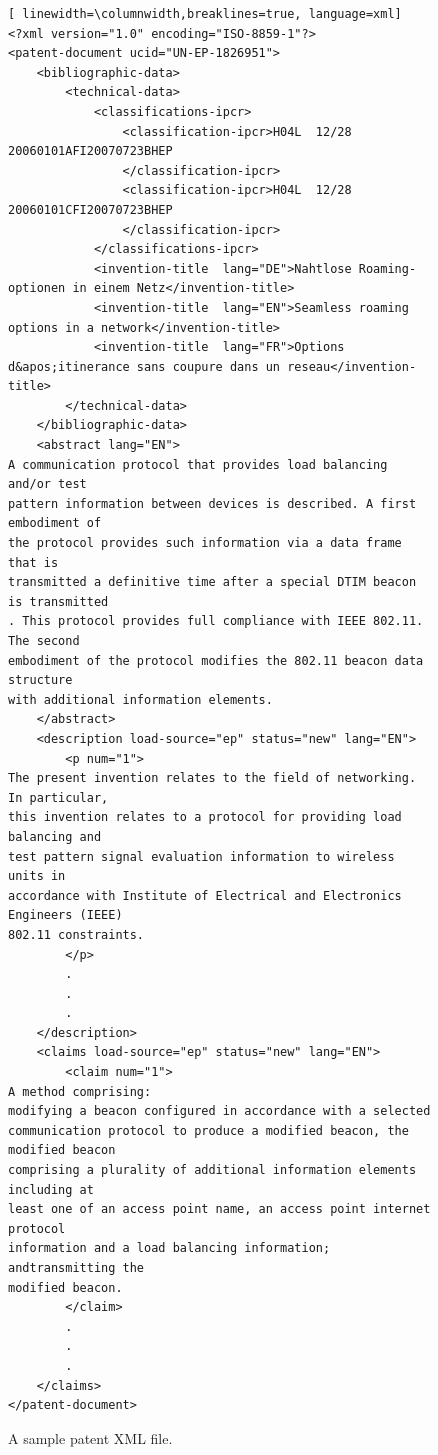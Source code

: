 \begin{figure}[htpb]
\begin{framed}
\vspace*{-2ex}
  \centering
  \begin{lstlisting}[ linewidth=\columnwidth,breaklines=true, language=xml]     
<?xml version="1.0" encoding="ISO-8859-1"?>
<patent-document ucid="UN-EP-1826951">
	<bibliographic-data>
		<technical-data>
			<classifications-ipcr>
				<classification-ipcr>H04L  12/28        20060101AFI20070723BHEP        
				</classification-ipcr>
				<classification-ipcr>H04L  12/28        20060101CFI20070723BHEP        
				</classification-ipcr>
			</classifications-ipcr>
			<invention-title  lang="DE">Nahtlose Roaming-optionen in einem Netz</invention-title>
			<invention-title  lang="EN">Seamless roaming options in a network</invention-title>
			<invention-title  lang="FR">Options d&apos;itinerance sans coupure dans un reseau</invention-title>
		</technical-data>
	</bibliographic-data>
	<abstract lang="EN">
A communication protocol that provides load balancing and/or test 
pattern information between devices is described. A first embodiment of 
the protocol provides such information via a data frame that is 
transmitted a definitive time after a special DTIM beacon is transmitted
. This protocol provides full compliance with IEEE 802.11. The second 
embodiment of the protocol modifies the 802.11 beacon data structure 
with additional information elements.
	</abstract>
	<description load-source="ep" status="new" lang="EN">
		<p num="1">
The present invention relates to the field of networking. In particular, 
this invention relates to a protocol for providing load balancing and 
test pattern signal evaluation information to wireless units in 
accordance with Institute of Electrical and Electronics Engineers (IEEE) 
802.11 constraints.
		</p>
		.
		.
		.
	</description>
	<claims load-source="ep" status="new" lang="EN">
		<claim num="1">
A method comprising:
modifying a beacon configured in accordance with a selected 
communication protocol to produce a modified beacon, the modified beacon 
comprising a plurality of additional information elements including at 
least one of an access point name, an access point internet protocol 
information and a load balancing information; andtransmitting the 
modified beacon.
		</claim>
		.
		.
		.
	</claims>
</patent-document>
    \end{lstlisting} 
\vspace*{-2ex}
\end{framed}
\vspace*{-2ex}
  \caption{A sample patent XML file.}
  \label{fig:PatentXML}  
\end{figure}
    

